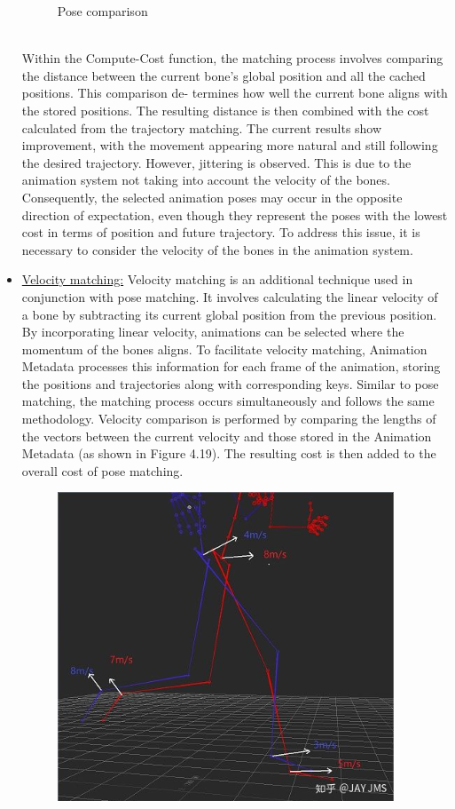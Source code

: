 \documentclass[12pt]{book}
\begin{document}
\begin{itemize}
\begin{figure}[!h]
              \caption{Pose comparison}
              \label{Pose comparison}
          \end{figure}\\
          Within the Compute-Cost function, the matching process involves comparing the distance
          between the current bone’s global position and all the cached positions. This comparison de-
          termines how well the current bone aligns with the stored positions. The resulting distance is
          then combined with the cost calculated from the trajectory matching.
          The current results show improvement, with the movement appearing more natural and still
          following the desired trajectory. However, jittering is observed. This is due to the animation
          system not taking into account the velocity of the bones. Consequently, the selected animation
          poses may occur in the opposite direction of expectation, even though they represent the poses
          with the lowest cost in terms of position and future trajectory. To address this issue, it is
          necessary to consider the velocity of the bones in the animation system.
    \item \underline{Velocity matching:}
          Velocity matching is an additional technique used in conjunction with pose matching. It involves
          calculating the linear velocity of a bone by subtracting its current global position from the
          previous position.
          By incorporating linear velocity, animations can be selected where the momentum of the bones
          aligns.
          To facilitate velocity matching, Animation Metadata processes this information for each
          frame of the animation, storing the positions and trajectories along with corresponding keys.
          Similar to pose matching, the matching process occurs simultaneously and follows the same
          methodology. Velocity comparison is performed by comparing the lengths of the vectors between
          the current velocity and those stored in the Animation Metadata (as shown in Figure 4.19).
          The resulting cost is then added to the overall cost of pose matching.
          \begin{figure}[!h]
              \centering
              \includegraphics[scale=0.7]{./Figures/Images/velocity matching.PNG}

\end{figure}
\end{itemize}
\end{document}
